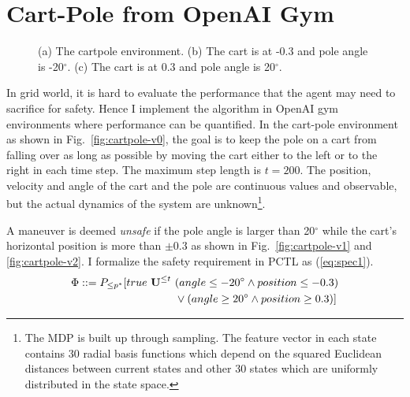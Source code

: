 {\section{Cart-Pole from OpenAI Gym}
\begin{figure}[hbt]
  \centering
  \caption{(a) The cartpole environment. (b) The cart is at -0.3 and pole angle is {-20}$^\circ$. (c) The cart is at 0.3 and pole angle is {20}$^\circ$.}    
\label{fig:cartpole}
\end{figure}
In grid world, it is hard to evaluate the performance that the agent may need to sacrifice for safety. Hence I implement the algorithm in OpenAI gym environments where performance can be quantified. In the cart-pole environment as shown in Fig.~\ref{fig:cartpole-v0}, the goal is to keep the pole on a cart from falling over as long as possible by moving the cart either to the left or to the right in each time step. The maximum step length is $t=200$. The position, velocity and angle of the cart and the pole are continuous values and observable, but the actual dynamics of the system are unknown\footnote{The MDP is built up through sampling. The feature vector in each state contains $30$ radial basis functions which depend on the squared Euclidean distances between current states and other $30$ states which are uniformly distributed in the state space.}. 
 
A maneuver is deemed {\it unsafe} if the pole angle is larger than 20$^\circ$ while the cart's horizontal position is more than $\pm 0.3$ as shown in Fig.~\ref{fig:cartpole-v1} and \ref{fig:cartpole-v2}. I formalize the safety requirement in PCTL as (\ref{eq:spec1}).
\begin{equation}
\begin{split}
\Phi ::= P_{\leq p^*}[true\ {\textbf{U}}^{\leq t}\ &(angle\leq -20^\circ\wedge position\leq-0.3)\\
&\vee(angle\geq 20^\circ\wedge position\geq 0.3)]
\end{split}
\label{eq:spec1}
\end{equation}

}
